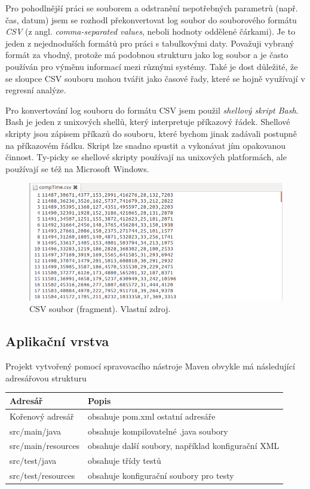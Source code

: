 \documentclass[a4paper,12pt,twoside]{scrreprt}
\begin{document}
Pro pohodlnější práci se souborem a odstranění nepotřebných parametrů (např. čas, datum) jsem se rozhodl překonvertovat log soubor do souborového formátu \textit{CSV} 	(z angl. \textit{comma-separated values}, neboli hodnoty oddělené čárkami). Je to jeden z nejednoduších formátů pro práci s tabulkovými daty. Považuji vybraný formát za vhodný, protože má podobnou strukturu jako log soubor a je často používán pro výměnu informací mezi různými systémy. Také je dost důležité, že se sloupce CSV souboru mohou tvářit jako časové řady, které se hojně využívají v regresní analýze.   

Pro konvertování log souboru do formátu CSV jsem použil \textit{shellový skript Bash}. Bash je jeden z unixových shellů, který interpretuje příkazový řádek. Shellové skripty jsou zápisem příkazů do souboru, které bychom jinak zadávali postupně na příkazovém řádku. Skript lze snadno spustit a vykonávat jím opakovanou činnost. Ty-picky se shellové skripty používají na unixových platformách, ale používají se též na Microsoft Windows.

\begin{figure}[h]
  \centering
  \includegraphics[width=15cm]{pictures/csv.png}
  \caption{CSV soubor (fragment). Vlastní zdroj.}
  \label{fig:csv}
\end{figure}

\newpage
\subsection{Aplikační vrstva}

Projekt vytvořený pomocí spravovacího nástroje Maven obvykle má následující adresářovou strukturu
\vspace*{0.5cm}

\begin{tabular}{|l|p{10cm}|}
  \hline
  {\bf Adresář} & {\bf Popis} \\
  \hline \hline
  Kořenový adresář        & obsahuje pom.xml ostatní adresáře \\
  \hline
  src/main/java     & obsahuje kompilovatelné .java soubory \\
  \hline
  src/main/resources    & obsahuje další soubory, například konfigurační XML \\
  \hline
  src/test/java          & obsahuje třídy testů \\
  \hline
  src/test/resources        & obsahuje konfigurační soubory pro testy \\
  \hline
\end{tabular}
\end{document}
